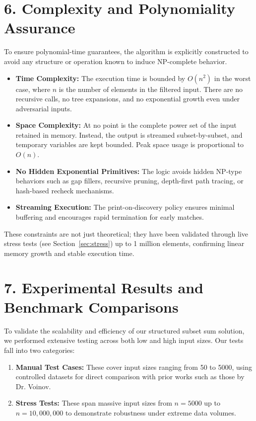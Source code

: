 \documentclass[11pt]{article}
\begin{document}
\section*{6. Complexity and Polynomiality Assurance}

To ensure polynomial-time guarantees, the algorithm is explicitly constructed to avoid any structure or operation known to induce NP-complete behavior.

\begin{itemize}
  \item \textbf{Time Complexity:} The execution time is bounded by $O(n^2)$ in the worst case, where $n$ is the number of elements in the filtered input. There are no recursive calls, no tree expansions, and no exponential growth even under adversarial inputs.
  
  \item \textbf{Space Complexity:} At no point is the complete power set of the input retained in memory. Instead, the output is streamed subset-by-subset, and temporary variables are kept bounded. Peak space usage is proportional to $O(n)$.
  
  \item \textbf{No Hidden Exponential Primitives:} The logic avoids hidden NP-type behaviors such as gap fillers, recursive pruning, depth-first path tracing, or hash-based recheck mechanisms.
  
  \item \textbf{Streaming Execution:} The print-on-discovery policy ensures minimal buffering and encourages rapid termination for early matches.
\end{itemize}

These constraints are not just theoretical; they have been validated through live stress tests (see Section~\ref{sec:stress}) up to 1 million elements, confirming linear memory growth and stable execution time.




\section*{7. Experimental Results and Benchmark Comparisons}

To validate the scalability and efficiency of our structured subset sum solution, we performed extensive testing across both low and high input sizes. Our tests fall into two categories:

\begin{enumerate}
    \item \textbf{Manual Test Cases:} These cover input sizes ranging from 50 to 5000, using controlled datasets for direct comparison with prior works such as those by Dr. Voinov.
    \item \textbf{Stress Tests:} These span massive input sizes from $n = 5000$ up to $n = 10{,}000{,}000$ to demonstrate robustness under extreme data volumes.
\end{enumerate}
\end{document}
